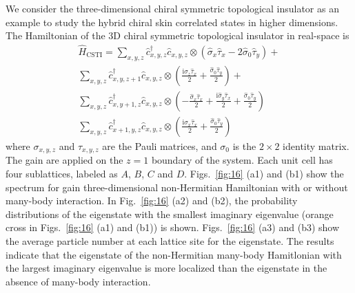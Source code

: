 \documentclass[longbibliography, aps, prx, amsmath, amssymb, amsfonts, twocolumn,superscriptaddress, footinbib]{revtex4-1}
\begin{document}
	We consider the three-dimensional chiral symmetric topological insulator as an example to study the hybrid chiral skin correlated states in higher dimensions. The Hamiltonian of the 3D chiral symmetric topological insulator in real-space is
	\begin{equation}
		\begin{split}
			\hat{H}_{\text{CSTI}} = \sum_{x,y,z} \hat{c}_{x,y,z}^{\dagger}\hat{c}_{x,y,z} \otimes (\hat{\sigma}_x \hat{\tau}_x - 2 \hat{\sigma}_0 \hat{\tau}_y) + \\
			\sum_{x,y,z} \hat{c}_{x,y,z+1}^{\dagger}\hat{c}_{x,y,z} \otimes ( \frac{\mathrm{i} \hat{\sigma}_z \hat{\tau}_x}{2} + \frac{\hat{\sigma}_0 \hat{\tau}_y}{2}) + \\
			\sum_{x,y,z} \hat{c}_{x,y+1,z}^{\dagger}\hat{c}_{x,y,z} \otimes (-\frac{\hat{\sigma}_x \hat{\tau}_x}{2} + \frac{\mathrm{i} \hat{\sigma}_y \hat{\tau}_x}{2} + \frac{\hat{\sigma}_0 \hat{\tau}_y}{2})\\
			\sum_{x,y,z} \hat{c}_{x+1,y,z}^{\dagger}\hat{c}_{x,y,z} \otimes ( \frac{\mathrm{i}\hat{\sigma}_x \hat{\tau}_x}{2} + \frac{\hat{\sigma}_0 \hat{\tau}_y}{2} )
		\end{split} %
	\end{equation}
	where $\sigma_{x,y,z}$ and $\tau_{x,y,z}$ are the Pauli matrices, and $\sigma_0$ is the $2\times 2$ identity matrix. The gain are applied on the $z=1$ boundary of the system. Each unit cell has four sublattices, labeled as $A$, $B$, $C$ and $D$. 
	Figs.~\ref{fig:16} (a1) and (b1) show the spectrum for gain three-dimensional non-Hermitian Hamiltonian with or without many-body interaction. 
	In Fig.~\ref{fig:16} (a2) and (b2), the probability distributions of the eigenstate with the smallest imaginary eigenvalue (orange cross in Figs.~\ref{fig:16} (a1) and (b1)) is shown.
	 Figs.~\ref{fig:16} (a3) and (b3) show the average particle number at each lattice site for the eigenstate.
	The results indicate that the eigenstate of the non-Hermitian many-body Hamitlonian with the largest imaginary eigenvalue is more localized than the eigenstate in the absence of many-body interaction.
\end{document}
